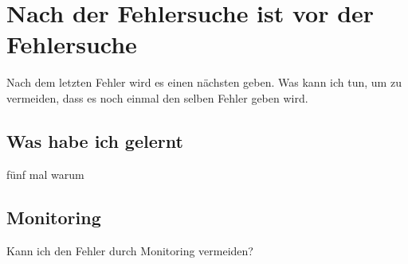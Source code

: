 \chapter{Nach der Fehlersuche ist vor der Fehlersuche}
\label{cha:ausblick}

\begin{abstractsec}
  Nach dem letzten Fehler wird es einen nächsten geben. Was kann ich tun, um
  zu vermeiden, dass es noch einmal den selben Fehler geben wird.
\end{abstractsec}

\section{Was habe ich gelernt}
\label{sec:was-habe-ich-gelernt}

\begin{notes}
\item fünf mal warum
\end{notes}

\section{Monitoring}
\label{sec:monitoring}

\begin{notes}
\item Kann ich den Fehler durch Monitoring vermeiden?
\end{notes}

